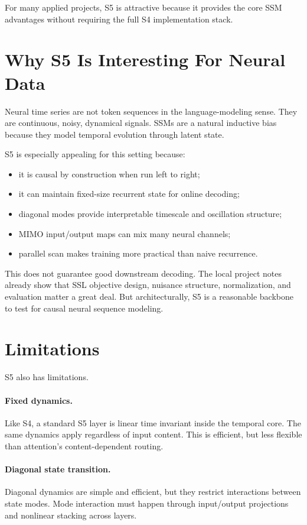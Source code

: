 For many applied projects, S5 is attractive because it provides the core SSM advantages
without requiring the full S4 implementation stack.

\section{Why S5 Is Interesting For Neural Data}

Neural time series are not token sequences in the language-modeling sense. They are
continuous, noisy, dynamical signals. SSMs are a natural inductive bias because they model
temporal evolution through latent state.

S5 is especially appealing for this setting because:

\begin{itemize}
  \item it is causal by construction when run left to right;
  \item it can maintain fixed-size recurrent state for online decoding;
  \item diagonal modes provide interpretable timescale and oscillation structure;
  \item MIMO input/output maps can mix many neural channels;
  \item parallel scan makes training more practical than naive recurrence.
\end{itemize}

This does not guarantee good downstream decoding. The local project notes already show
that SSL objective design, nuisance structure, normalization, and evaluation matter a
great deal. But architecturally, S5 is a reasonable backbone to test for causal neural
sequence modeling.

\section{Limitations}

S5 also has limitations.

\paragraph{Fixed dynamics.}
Like S4, a standard S5 layer is linear time invariant inside the temporal core. The same
dynamics apply regardless of input content. This is efficient, but less flexible than
attention's content-dependent routing.

\paragraph{Diagonal state transition.}
Diagonal dynamics are simple and efficient, but they restrict interactions between state
modes. Mode interaction must happen through input/output projections and nonlinear
stacking across layers.

